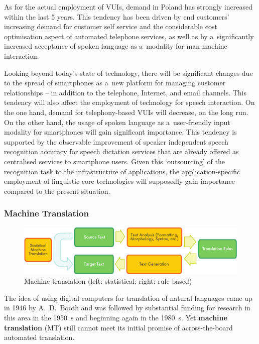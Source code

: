 \begin{multicols}{2}
As for the actual employment of VUIs, demand in Poland has strongly
increased within the last 5 years. This tendency has been driven by
end customers’ increasing demand for customer self service and the
considerable cost optimisation aspect of automated telephone services,
as well as by a~significantly increased acceptance of spoken language
as a~modality for man-machine interaction. 

Looking beyond today’s state of technology, there will be
significant changes due to the spread of smartphones as a~new platform
for managing customer relationships – in addition to the telephone,
Internet, and email channels. This tendency will also affect the
employment of technology for speech interaction. On the one hand,
demand for telephony-based VUIs will decrease, on the long run. On the
other hand, the usage of spoken language as a~user-friendly input
modality for smartphones will gain significant importance. This
tendency is supported by the observable improvement of speaker
independent speech recognition accuracy for speech dictation services
that are already offered as centralised services to smartphone users.
Given this ‘outsourcing’ of the recognition task to the
infrastructure of applications, the application-specific employment of
linguistic core technologies will supposedly gain importance compared
to the present situation. 

\subsubsection{Machine Translation} 

\begin{figure}[htb]  \center
\includegraphics[width=\textwidth]{../_media/english/machine_translation}
\caption{Machine translation (left: statistical; right: rule-based)}
\label{fig: mtarch_en} 
\end{figure} 

The idea of using digital computers for translation of natural
languages came up in 1946 by A.~D.~Booth and was followed by
substantial funding for research in this area in the 1950~s and
beginning again in the 1980~s. Yet \textbf{machine translation} (MT)
still cannot meet its initial promise of across-the-board automated
translation.


\end{multicols}
